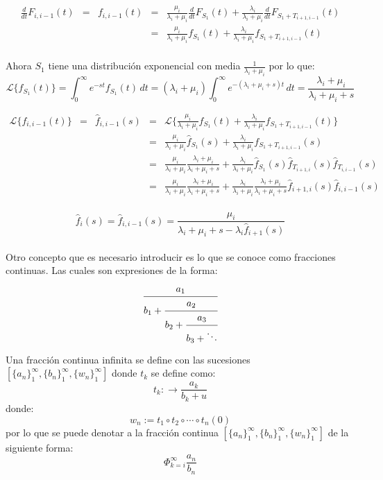 \documentclass[11pt]{article}
\numberwithin{equation}{section} %
\begin{document}
\[
\begin{array}{rcrcl}
\frac{d}{dt} F_{i,i-1}(t) & = & f_{i,i-1}(t) & = & \frac{\mu_{i}}{\lambda_{i}+\mu_{i}} \frac{d}{dt} F_{S_{1}}(t) + \frac{\lambda_{i}}{\lambda_{i}+\mu_{i}} \frac{d}{dt} F_{ S_{1} + T_{i+1,i-1}}(t)\\
 & & & = & \frac{\mu_{i}}{\lambda_{i}+\mu_{i}} f_{S_{1}}(t) + \frac{\lambda_{i}}{\lambda_{i}+\mu_{i}} f_{ S_{1} + T_{i+1,i-1}}(t)\\
\end{array}
\]

Ahora $S_1$ tiene una distribución exponencial con media $\frac{1}{\lambda_i+\mu_i}$ por lo que:
\[
\mathcal{L}\{f_{S_1}(t)\}=\int_{0}^{\infty} e^{-st} f_{S_1}(t)\,dt=(\lambda_i+\mu_i)\int_{0}^{\infty} e^{-(\lambda_i+\mu_i+s)t}\,dt=\frac{\lambda_i+\mu_i}{\lambda_i+\mu_i+s}
\]

\[
\begin{array}{rcrcl}
\mathcal{L} \{ f_{i,i-1}(t) \} & = & \hat{f}_{i,i-1}(s) & = & \mathcal{L} \{ \frac{\mu_{i}}{\lambda_{i}+\mu_{i}} f_{S_{1}}(t) + \frac{\lambda_{i}}{\lambda_{i}+\mu_{i}} f_{ S_{1} + T_{i+1,i-1}}(t) \}\\
 & & & = & \frac{\mu_{i}}{\lambda_{i}+\mu_{i}} \hat{f}_{S_{1}}(s) + \frac{\lambda_{i}}{\lambda_{i}+\mu_{i}} f_{ S_{1} + T_{i+1,i-1}}(s) \\
 & & & = & \frac{\mu_{i}}{\lambda_{i}+\mu_{i}} \frac{\lambda_{i}+\mu_{i}}{\lambda_{i}+\mu_{i}+s} + \frac{\lambda_{i}}{\lambda_{i}+\mu_{i}} \hat{f}_{S_{1}}(s) \hat{f}_{T_{i+1,i}}(s) \hat{f}_{T_{i,i-1}}(s) \\
 & & & = & \frac{\mu_{i}}{\lambda_{i}+\mu_{i}} \frac{\lambda_{i}+\mu_{i}}{\lambda_{i}+\mu_{i}+s} + \frac{\lambda_{i}}{\lambda_{i}+\mu_{i}} \frac{\lambda_{i}+\mu_{i}}{\lambda_{i}+\mu_{i}+s} \hat{f}_{i+1,i}(s) \hat{f}_{i,i-1}(s) \\
\end{array}
\]
 
\begin{equation}
\hat{f}_i (s) = \hat{f}_{i,i-1}(s) = \frac{\mu_{i}}{\lambda_{i}+\mu_{i}+s-\lambda_{i}\hat{f}_{i+1}(s)}
\end{equation}\\

Otro concepto que es necesario introducir es lo que se conoce como fracciones continuas. Las cuales son expresiones de la forma:
\[
\cfrac{a_1}{b_1 + 
\cfrac{a_2}{b_2 + 
\cfrac{a_3}{b_3+ \ddots}}}
\]

Una fracción continua infinita se define con las sucesiones $\left[\{a_n\}_1^{\infty},\{b_n\}_1^{\infty},\{w_n\}_1^{\infty}\right]$ donde $t_k$ se define como:
\[
t_k:\rightarrow \frac{a_k}{b_k+u}
\]
donde:
\[
w_n:=t_1\circ t_2 \circ \cdots \circ t_n(0)
\]
por lo que se puede denotar a la fracción continua $\left[\{a_n\}_1^{\infty},\{b_n\}_1^{\infty},\{w_n\}_1^{\infty}\right]$ de la siguiente forma:
\[
\Phi_{k=i}^{\infty}\frac{a_n}{b_n}
\]
\end{document}
